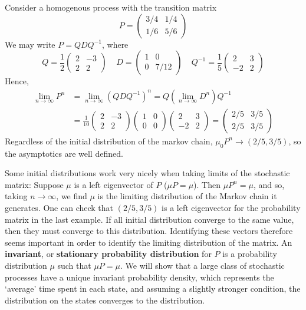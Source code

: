 \begin{example}
    Consider a homogenous process with the transition matrix
    \[ P = \begin{pmatrix} 3/4 & 1/4 \\ 1/6 & 5/6 \end{pmatrix} \]
    We may write $P = QDQ^{-1}$, where
    \[ Q = \frac{1}{2} \begin{pmatrix} 2 & -3 \\ 2 & 2 \end{pmatrix} \ \ \ \ \ D = \begin{pmatrix} 1 & 0 \\ 0 & 7/12 \end{pmatrix} \ \ \ \ \ Q^{-1} = \frac{1}{5} \begin{pmatrix} 2 & 3 \\ -2 & 2 \end{pmatrix} \]
    Hence,
    \begin{align*}
        \lim_{n \to \infty} P^n &= \lim_{n \to \infty} (QDQ^{-1})^n = Q (\lim_{n \to \infty} D^n) Q^{-1}\\
        &= \frac{1}{10} \begin{pmatrix} 2 & -3 \\ 2 & 2 \end{pmatrix} \begin{pmatrix} 1 & 0 \\ 0 & 0 \end{pmatrix} \begin{pmatrix} 2 & 3 \\ -2 & 2 \end{pmatrix} = \begin{pmatrix} 2/5 & 3/5 \\ 2/5 & 3/5 \end{pmatrix}
    \end{align*}
    Regardless of the initial distribution of the markov chain, $\mu_0P^n \to (2/5, 3/5)$, so the asymptotics are well defined.
\end{example}

Some initial distributions work very nicely when taking limits of the stochastic matrix: Suppose $\mu$ is a left eigenvector of $P$ ($\mu P = \mu$). Then $\mu P^n = \mu$, and so, taking $n \to \infty$, we find $\mu$ is the limiting distribution of the Markov chain it generates. One can check that $(2/5, 3/5)$ is a left eigenvector for the probability matrix in the last example. If all initial distribution converge to the same value, then they must converge to this distribution. Identifying these vectors therefore seems important in order to identify the limiting distribution of the matrix. An {\bf invariant}, or {\bf stationary probability distribution} for $P$ is a probability distribution $\mu$ such that $\mu P = \mu$. We will show that a large class of stochastic processes have a unique invariant probability density, which represents the `average' time spent in each state, and assuming a slightly stronger condition, the distribution on the states converges to the distribution.

